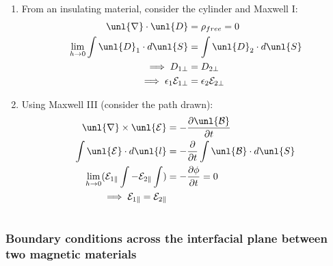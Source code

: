 \documentclass[a4paper, 11pt, normalem]{report}
\newcommand\p{\partial}
\newcommand\E{\mathcal{E}}
\newcommand\uE{\unl{\E}}
\newcommand\B{\mathcal{B}}
\newcommand\uB{\unl{\B}}
\newcommand\del{\unl{\nabla}}
\newcommand\e{\epsilon}
\begin{document}
\begin{enumerate}
	\item From an insulating material, consider the cylinder and Maxwell \RN{1}:
	\begin{align}
		\del\cdot\unl{D} &= \rho_{free} = 0 \\
		\lim_{h\to0} \int \unl{D}_1\cdot d\unl{S} &= \int \unl{D}_2\cdot d\unl{S} \\
		\implies D_{1\perp} &= D_{2\perp} \\
		\implies \e_1\E_{1\perp} &= \e_2\E_{2\perp}
	\end{align}
	\item Using Maxwell \RN{3} (consider the path drawn):
	\begin{align}
		\del\times\uE &= -\frac{\p \uB}{\p t} \\
		\int \uE\cdot d\unl{l} &= -\frac{\p}{\p t}\int \uB\cdot d\unl{S} \\
		\lim_{h\to0} (\E_{1\parallel} \int - \E_{2\parallel}\int) &= -\frac{\p\phi}{\p t} = 0 \\
		\implies \E_{1\parallel} = \E_{2\parallel}
	\end{align}
\end{enumerate}


\chapter{}
\subsection{Boundary conditions across the interfacial plane between two magnetic materials}
\end{document}
